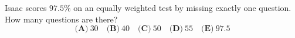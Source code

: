 Isaac scores $97.5\%$ on an equally weighted test by missing exactly one question. How many questions are there?
\[\textbf{(A)}~30\quad\textbf{(B)}~40\quad\textbf{(C)}~50\quad\textbf{(D)}~55\quad\textbf{(E)}~97.5\]

